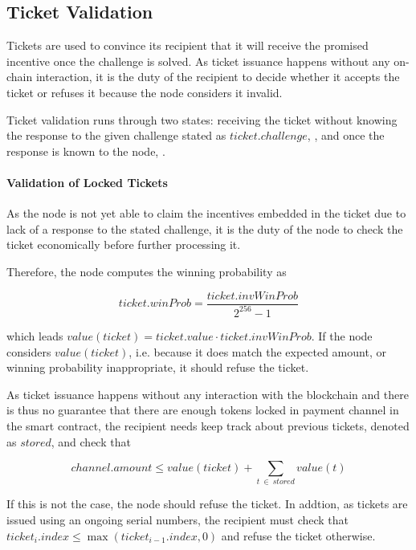 \subsection{Ticket Validation}
\label{sec:tickets:validation}

Tickets are used to convince its recipient that it will receive the promised incentive once the challenge is solved. As ticket issuance happens without any on-chain interaction, it is the duty of the recipient to decide whether it accepts the ticket or refuses it because the node considers it invalid.

Ticket validation runs through two states: receiving the ticket without knowing the response to the given challenge stated as $ticket.challenge$, , and once the response is known to the node, .

\paragraph{Validation of Locked Tickets}
\label{sec:tickets:validation:locked}

As the node is not yet able to claim the incentives embedded in the ticket due to lack of a response to the stated challenge, it is the duty of the node to check the ticket economically before further processing it.

Therefore, the node computes the winning probability as

$$ticket.winProb = \frac{ticket.invWinProb}{2^{256} - 1} $$

which leads $ value(ticket) = ticket.value \cdot ticket.invWinProb $. If the node considers $value(ticket)$, i.e. because it does match the expected amount, or winning probability inappropriate, it should refuse the ticket.

As ticket issuance happens without any interaction with the blockchain and there is thus no guarantee that there are enough tokens locked in payment channel in the smart contract, the recipient needs keep track about previous tickets, denoted as $stored$, and check that

$$ channel.amount \le value(ticket) + \sum_{t \ \in \ stored} value(t)$$

If this is not the case, the node should refuse the ticket. In addtion, as tickets are issued using an ongoing serial numbers, the recipient must check that $ticket_i.index \le \max(ticket_{i-1}.index,0)$ and refuse the ticket otherwise.

